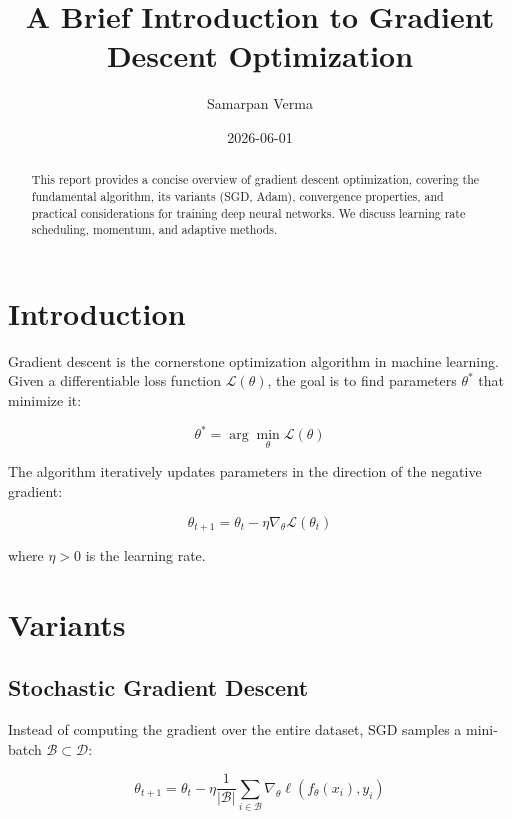 \documentclass[conference]{IEEEtran}
\title{A Brief Introduction to Gradient Descent Optimization}
\author{Samarpan Verma}
\date{2026-06-01}
\begin{document}
\maketitle

\begin{abstract}
This report provides a concise overview of gradient descent optimization, covering the fundamental algorithm, its variants (SGD, Adam), convergence properties, and practical considerations for training deep neural networks. We discuss learning rate scheduling, momentum, and adaptive methods.
\end{abstract}

\section{Introduction}

Gradient descent is the cornerstone optimization algorithm in machine learning. Given a differentiable loss function $\mathcal{L}(\theta)$, the goal is to find parameters $\theta^*$ that minimize it:

\begin{equation}
\theta^* = \arg\min_\theta \mathcal{L}(\theta)
\end{equation}

The algorithm iteratively updates parameters in the direction of the negative gradient:

\begin{equation}
\theta_{t+1} = \theta_t - \eta \nabla_\theta \mathcal{L}(\theta_t)
\end{equation}

where $\eta > 0$ is the learning rate.

\section{Variants}

\subsection{Stochastic Gradient Descent}

Instead of computing the gradient over the entire dataset, SGD samples a mini-batch $\mathcal{B} \subset \mathcal{D}$:

\begin{equation}
\theta_{t+1} = \theta_t - \eta \frac{1}{|\mathcal{B}|} \sum_{i \in \mathcal{B}} \nabla_\theta \ell(f_\theta(x_i), y_i)
\end{equation}
\end{document}
